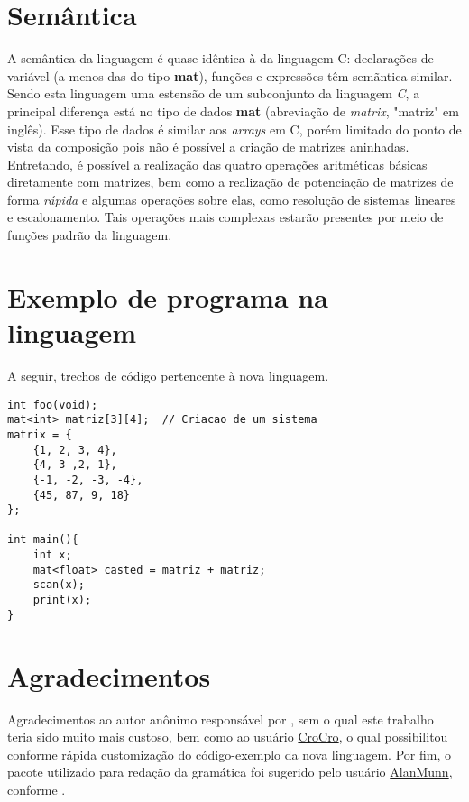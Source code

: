 \documentclass[
	article,			%
	11pt,				%
	oneside,			%
	a4paper,			%
	english,			%
	brazil,				%
	sumario=tradicional
	]{abntex2}
\renewcommand{\it}[1]{\textit{#1}}
\renewcommand{\bf}[1]{\textbf{#1}}
\begin{document}
\section{Semântica}
A semântica da linguagem é quase idêntica à da linguagem C: declarações de variável (a menos das do tipo \bf{mat}), funções e expressões têm semãntica similar. Sendo esta linguagem uma estensão de um subconjunto da linguagem \it{C}, a principal diferença está no tipo de dados \bf{mat} (abreviação de \it{matrix}, "matriz" em inglês). Esse tipo de dados é similar aos \it{arrays} em C, porém limitado do ponto de vista da composição pois não é possível a criação de matrizes aninhadas. Entretando, é possível a realização das quatro operações aritméticas básicas diretamente com matrizes, bem como a realização de potenciação de matrizes de forma \it{rápida} e algumas operações sobre elas, como resolução de sistemas lineares e escalonamento. Tais operações mais complexas estarão presentes por meio de funções padrão da linguagem.

\section{Exemplo de programa na linguagem}
A seguir, trechos de código pertencente à nova linguagem.

\begin{lstlisting}[style=CStyle]
int foo(void);
mat<int> matriz[3][4];	// Criacao de um sistema 
matrix = {
	{1, 2, 3, 4},
	{4, 3 ,2, 1},
	{-1, -2, -3, -4},
	{45, 87, 9, 18}
};

int main(){
	int x;
	mat<float> casted = matriz + matriz;
	scan(x);
	print(x); 
}
\end{lstlisting}

\section{Agradecimentos}
Agradecimentos ao autor anônimo responsável por \cite{gramatica}, sem o qual este trabalho teria sido muito mais custoso, bem como ao usuário \hyperref{https://tex.stackexchange.com/users/42366/croco}{}{}{CroCro}, o qual possibilitou conforme \cite{custom} rápida customização do código-exemplo da nova linguagem. Por fim, o pacote utilizado para redação da gramática foi sugerido pelo usuário \hyperref{https://tex.stackexchange.com/questions/348651/c-code-to-add-in-the-document}{}{}{AlanMunn}, conforme \cite{bnf}.

% 

\postextual


\end{document}
